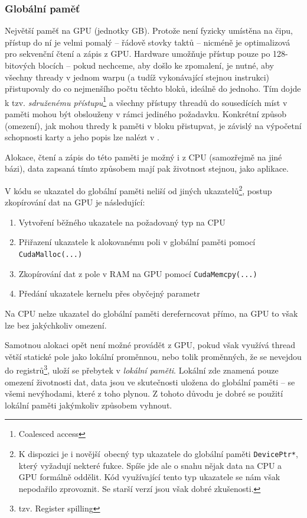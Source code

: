     \subsubsection{Globální paměť}

    Největší paměť na GPU (jednotky GB). Protože není fyzicky umístěna na čipu, přístup do ní je velmi pomalý -- řádově stovky taktů -- nicméně je optimalizová pro sekvenční čtení a zápis z GPU. Hardware umožňuje přístup pouze po 128-bitových blocích -- pokud nechceme, aby došlo ke zpomalení, je nutné, aby všechny thready v jednom warpu (a tudíž vykonávající stejnou instrukci) přistupovaly do co nejmenšího počtu těchto bloků, ideálně do jednoho. Tím dojde k tzv. \emph{sdruženému přístupu}\footnote{Coalesced access} a všechny přístupy threadů do sousedících míst v paměti mohou být obslouženy v rámci jediného požadavku. Konkrétní způsob (omezení), jak mohou thredy k paměti v bloku přistupvat, je závislý na výpočetní schopnosti karty a jeho popis lze nalézt v \cite{CUDA programming g.}.

    Alokace, čtení a zápis do této paměti je možný i z CPU (samozřejmě na jiné bázi), data zapsaná tímto způsobem mají pak životnost stejnou, jako aplikace.

    V kódu se ukazatel do globální paměti neliší od jiných ukazatelů\footnote{K dispozici je i \bq novější\eq ~obecný typ ukazatele do globální paměti {\tt DevicePtr*}, který vyžadují nekteré fukce. Spíše jde ale o snahu nějak data na CPU a GPU formálně oddělit. Kód využívající tento typ ukazatele se nám však nepodařilo zprovoznit. Se starší verzí jsou však dobré zkušenosti.}, postup zkopírování dat na GPU je následující:
    \begin{enumerate}
      \item Vytvoření běžného ukazatele na požadovaný typ na CPU
      \item Přiřazení ukazatele k alokovanému poli v globální paměti pomocí {\tt CudaMalloc(...)}
      \item Zkopírování dat z pole v RAM na GPU pomocí {\tt CudaMemcpy(...)}
      \item Předání ukazatele kernelu přes obyčejný parametr
    \end{enumerate}
    Na CPU nelze ukazatel do globální paměti dereferncovat přímo, na GPU to však lze bez jakýchkoliv omezení.

    Samotnou alokaci opět není možné provádět z GPU, pokud však využívá thread větší statické pole jako lokální proměnnou, nebo tolik proměnných, že se nevejdou do registrů\footnote{tzv. Register spilling}, uloží se přebytek v \emph{lokální paměti}. Lokální zde znamená pouze omezení životnosti dat, data jsou ve skutečnosti uložena do globální paměti -- se všemi nevýhodami, které z toho plynou. Z tohoto důvodu je dobré se použití lokální paměti jakýmkoliv způsobem vyhnout.

